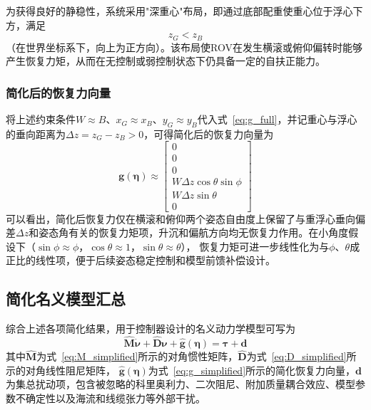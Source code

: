 为获得良好的静稳性，系统采用"深重心"布局，即通过底部配重使重心位于浮心下方，满足
\begin{equation}
    z_G < z_B
\end{equation}
（在世界坐标系下，向上为正方向）。该布局使ROV在发生横滚或俯仰偏转时能够产生恢复力矩，从而在无控制或弱控制状态下仍具备一定的自扶正能力。


\subsubsection{简化后的恢复力向量}

将上述约束条件$W\approx B$、$x_G\approx x_B$、$y_G\approx y_B$代入式~\eqref{eq:g_full}，并记重心与浮心的垂向距离为$\Delta z=z_G-z_B>0$，可得简化后的恢复力向量为
\begin{equation}
    \boldsymbol{g}(\boldsymbol{\eta})\approx
    \begin{bmatrix}
        0 \\
        0 \\
        0 \\
        W\Delta z\cos\theta\sin\phi \\
        W\Delta z\sin\theta \\
        0
    \end{bmatrix}
    \label{eq:g_simplified}
\end{equation}
可以看出，简化后恢复力仅在横滚和俯仰两个姿态自由度上保留了与重浮心垂向偏差$\Delta z$和姿态角有关的恢复力矩项，升沉和偏航方向均无恢复力作用。在小角度假设下（$\sin\phi\approx\phi$，$\cos\theta\approx 1$，$\sin\theta\approx\theta$），
恢复力矩可进一步线性化为与$\phi$、$\theta$成正比的线性项，便于后续姿态稳定控制和模型前馈补偿设计。

\subsection{简化名义模型汇总}

综合上述各项简化结果，用于控制器设计的名义动力学模型可写为
\begin{equation}
    \hat{\boldsymbol{M}}\dot{\boldsymbol{\nu}}
    +\hat{\boldsymbol{D}}\boldsymbol{\nu}
    +\hat{\boldsymbol{g}}(\boldsymbol{\eta})
    =\boldsymbol{\tau}+\boldsymbol{d}
    \label{eq:simplified_model}
\end{equation}
其中$\hat{\boldsymbol{M}}$为式~\eqref{eq:M_simplified}所示的对角惯性矩阵，$\hat{\boldsymbol{D}}$为式~\eqref{eq:D_simplified}所示的对角线性阻尼矩阵，
$\hat{\boldsymbol{g}}(\boldsymbol{\eta})$为式~\eqref{eq:g_simplified}所示的简化恢复力向量，$\boldsymbol{d}$为集总扰动项，包含被忽略的科里奥利力、二次阻尼、附加质量耦合效应、模型参数不确定性以及海流和线缆张力等外部干扰。

